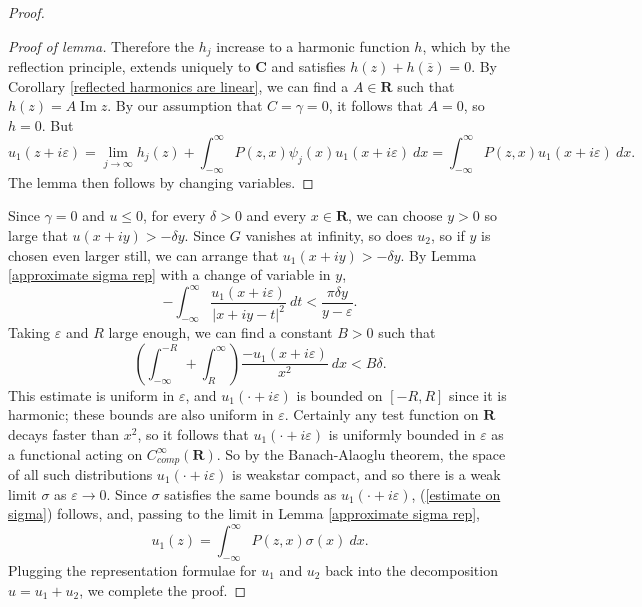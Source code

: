 \documentclass[12pt]{report}
\newcommand{\RR}{\mathbf{R}}
\newcommand{\CC}{\mathbf{C}}
\renewcommand{\Im}{\operatorname{Im}}
\theoremstyle{definition}
\theoremstyle{remark}
\begin{document}
\begin{proof}
\begin{proof}[Proof of lemma]
    Therefore the $h_j$ increase to a harmonic function $h$, which by the reflection principle, extends uniquely to $\CC$ and satisfies $h(z) + h(\overline z) = 0$. By Corollary \ref{reflected harmonics are linear}, we can find a $A \in \RR$ such that $h(z) = A\Im z$. By our assumption that $C = \gamma = 0$, it follows that $A = 0$, so $h = 0$. But
    $$u_1(z + i\varepsilon) = \lim_{j \to \infty} h_j(z) + \int_{-\infty}^\infty P(z, x)\psi_j(x)u_1(x + i\varepsilon)~dx = \int_{-\infty}^\infty P(z, x)u_1(x + i\varepsilon) ~dx.$$
    The lemma then follows by changing variables.
\end{proof}
    Since $\gamma = 0$ and $u \leq 0$, for every $\delta > 0$ and every $x \in \RR$, we can choose $y > 0$ so large that $u(x + iy) > -\delta y$. Since $G$ vanishes at infinity, so does $u_2$, so if $y$ is chosen even larger still, we can arrange that $u_1(x + iy) > -\delta y$. By Lemma \ref{approximate sigma rep} with a change of variable in $y$,
$$-\int_{-\infty}^\infty \frac{u_1(x + i\varepsilon)}{|x + iy - t|^2} ~dt < \frac{\pi \delta y}{y - \varepsilon}.$$
    Taking $\varepsilon$ and $R$ large enough, we can find a constant $B > 0$ such that
$$\left(\int_{-\infty}^{-R} + \int_R^\infty\right) \frac{-u_1(x + i\varepsilon)}{x^2} ~dx < B \delta.$$
    This estimate is uniform in $\varepsilon$, and $u_1(\cdot + i\varepsilon)$ is bounded on $[-R, R]$ since it is harmonic; these bounds are also uniform in $\varepsilon$. Certainly any test function on $\RR$ decays faster than $x^2$, so it follows that $u_1(\cdot + i\varepsilon)$ is uniformly bounded in $\varepsilon$ as a functional acting on $C^\infty_{comp}(\RR)$. So by the Banach-Alaoglu theorem, the space of all such distributions $u_1(\cdot + i\varepsilon)$ is weakstar compact, and so there is a weak limit $\sigma$ as $\varepsilon \to 0$. Since $\sigma$ satisfies the same bounds as $u_1(\cdot + i\varepsilon)$, (\ref{estimate on sigma}) follows, and, passing to the limit in Lemma \ref{approximate sigma rep},
$$u_1(z) = \int_{-\infty}^\infty P(z, x) \sigma(x) ~dx.$$
    Plugging the representation formulae for $u_1$ and $u_2$ back into the decomposition $u = u_1 + u_2$, we complete the proof.
\end{proof}
\end{document}
